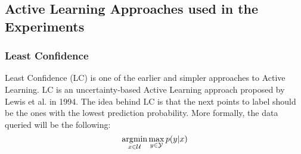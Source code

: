 \subsection{Active Learning Approaches used in the Experiments}
\subsubsection{Least Confidence}
Least Confidence (LC) is one of the earlier and simpler approaches to Active Learning. LC is an uncertainty-based Active Learning
approach proposed by Lewis et al. \cite{lewis1994sequential} in 1994. The idea behind LC is that the next points to label should be the 
ones with the lowest prediction probability. More formally, the data queried will be the following:
\begin{equation}
    \operatorname*{\arg\!\min}_{x \in \mathcal{U}} \max_{y \in \mathcal{Y}} p(y|x)
\end{equation}
